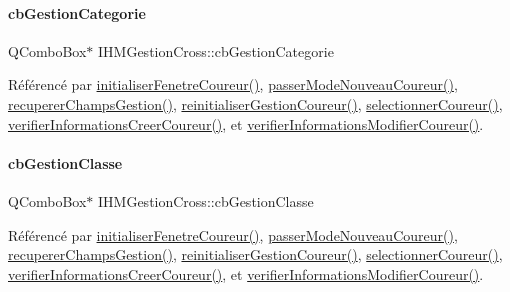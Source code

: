 \paragraph{\texorpdfstring{cb\+Gestion\+Categorie}{cbGestionCategorie}}
{\footnotesize\ttfamily Q\+Combo\+Box$\ast$ I\+H\+M\+Gestion\+Cross\+::cb\+Gestion\+Categorie\hspace{0.3cm}{\ttfamily [private]}}



Référencé par \hyperlink{class_i_h_m_gestion_cross_aa5d9de499a66e52b843c4ef4c6074a60}{initialiser\+Fenetre\+Coureur()}, \hyperlink{class_i_h_m_gestion_cross_ac8f336c95a5f0c9eb8a4bc1c4bb83445}{passer\+Mode\+Nouveau\+Coureur()}, \hyperlink{class_i_h_m_gestion_cross_a271efe8d31fbe05fccfb2dc81e71971a}{recuperer\+Champs\+Gestion()}, \hyperlink{class_i_h_m_gestion_cross_a85c44933ec0dcbb591e01c832063367e}{reinitialiser\+Gestion\+Coureur()}, \hyperlink{class_i_h_m_gestion_cross_ad71963d500fd61995fdae94e833db163}{selectionner\+Coureur()}, \hyperlink{class_i_h_m_gestion_cross_ae08eec25f5a6d33bf133b0cee78c7c5c}{verifier\+Informations\+Creer\+Coureur()}, et \hyperlink{class_i_h_m_gestion_cross_a0e088653019d8adefb371348f272d2e2}{verifier\+Informations\+Modifier\+Coureur()}.

\mbox{\label{class_i_h_m_gestion_cross_af734c4b13942dd83fbbd0355e3728c9f}} 
\paragraph{\texorpdfstring{cb\+Gestion\+Classe}{cbGestionClasse}}
{\footnotesize\ttfamily Q\+Combo\+Box$\ast$ I\+H\+M\+Gestion\+Cross\+::cb\+Gestion\+Classe\hspace{0.3cm}{\ttfamily [private]}}



Référencé par \hyperlink{class_i_h_m_gestion_cross_aa5d9de499a66e52b843c4ef4c6074a60}{initialiser\+Fenetre\+Coureur()}, \hyperlink{class_i_h_m_gestion_cross_ac8f336c95a5f0c9eb8a4bc1c4bb83445}{passer\+Mode\+Nouveau\+Coureur()}, \hyperlink{class_i_h_m_gestion_cross_a271efe8d31fbe05fccfb2dc81e71971a}{recuperer\+Champs\+Gestion()}, \hyperlink{class_i_h_m_gestion_cross_a85c44933ec0dcbb591e01c832063367e}{reinitialiser\+Gestion\+Coureur()}, \hyperlink{class_i_h_m_gestion_cross_ad71963d500fd61995fdae94e833db163}{selectionner\+Coureur()}, \hyperlink{class_i_h_m_gestion_cross_ae08eec25f5a6d33bf133b0cee78c7c5c}{verifier\+Informations\+Creer\+Coureur()}, et \hyperlink{class_i_h_m_gestion_cross_a0e088653019d8adefb371348f272d2e2}{verifier\+Informations\+Modifier\+Coureur()}.

